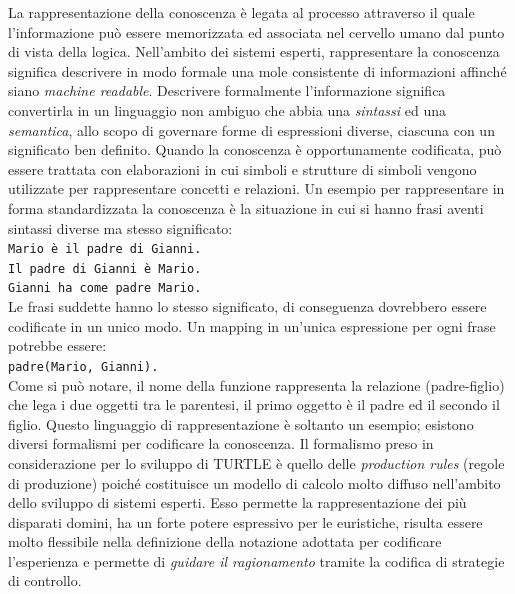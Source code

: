 La rappresentazione della conoscenza è legata al processo attraverso il quale l'informazione può essere memorizzata ed associata nel cervello umano dal punto di vista della logica. Nell'ambito dei sistemi esperti, rappresentare la conoscenza significa descrivere in modo formale una mole consistente di informazioni affinché siano \emph{machine readable}. Descrivere formalmente l'informazione significa convertirla in un linguaggio non ambiguo che abbia una \emph{sintassi} ed una \emph{semantica}, allo scopo di governare forme di espressioni diverse, ciascuna con un significato ben definito. Quando la conoscenza è opportunamente codificata, può essere trattata con elaborazioni in cui simboli e strutture di simboli vengono utilizzate per rappresentare concetti e relazioni.
Un esempio per rappresentare in forma standardizzata la conoscenza è la situazione in cui si hanno frasi aventi sintassi diverse ma stesso significato:
\\

\hspace{1cm} \verb!Mario è il padre di Gianni.!\\

\hspace{1cm} \verb!Il padre di Gianni è Mario.!\\

\hspace{1cm} \verb!Gianni ha come padre Mario.!\\


Le frasi suddette hanno lo stesso significato, di conseguenza dovrebbero essere codificate in un unico modo. Un mapping in un'unica espressione per ogni frase potrebbe essere:
\\

\hspace{1cm} \verb!padre(Mario, Gianni).!\\

Come si può notare, il nome della funzione rappresenta la relazione (padre-figlio) che lega i due oggetti tra le parentesi, il primo oggetto è il padre ed il secondo il figlio. Questo linguaggio di rappresentazione è soltanto un esempio; esistono diversi formalismi per codificare la conoscenza. Il formalismo preso in considerazione per lo sviluppo di TURTLE è quello delle \emph{production rules} (regole di produzione) poiché costituisce un modello di calcolo molto diffuso nell'ambito dello sviluppo di sistemi esperti. Esso permette la rappresentazione dei più disparati domini, ha un forte potere espressivo per le euristiche, risulta essere molto flessibile nella definizione della notazione adottata per codificare l'esperienza e permette di \emph{guidare il ragionamento} tramite la codifica di strategie di controllo.

